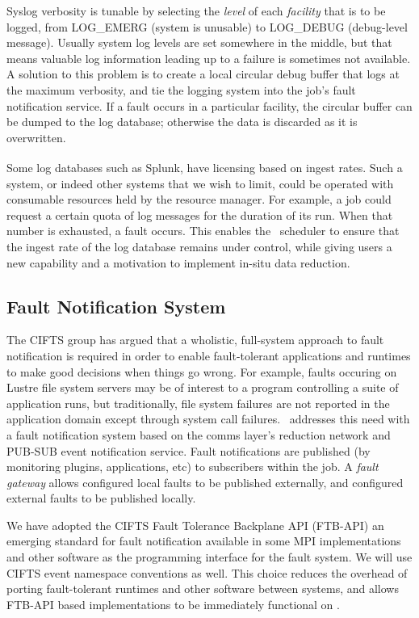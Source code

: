 Syslog verbosity is tunable by selecting the {\em level} of each
{\em facility} that is to be logged, from LOG\_EMERG (system is unusable)
to LOG\_DEBUG (debug-level message).  Usually system log levels are set
somewhere in the middle, but that means valuable log information leading
up to a failure is sometimes not available.  A solution to this problem is
to create a local circular debug buffer that logs at the maximum verbosity,
and tie the logging system into the job's fault notification service.
If a fault occurs in a particular facility, the circular buffer can be
dumped to the log database; otherwise the data is discarded as it is
overwritten.

Some log databases such as Splunk\textsuperscript{\textregistered},
have licensing based on ingest rates.  Such a system, or indeed other
systems that we wish to limit, could be operated with consumable resources
held by the resource manager.  For example, a job could request a certain
quota of log messages for the duration of its run.  When that number
is exhausted, a fault occurs.  This enables the \ngrm\ scheduler to ensure
that the ingest rate of the log database remains under control, while
giving users a new capability and a motivation to implement in-situ data
reduction.

\subsection{Fault Notification System}

The CIFTS group has argued\cite{CIFTS} that a wholistic, full-system approach
to fault notification is required in order to enable fault-tolerant
applications and runtimes to make good decisions when things go wrong.
For example, faults occuring on Lustre file system servers may be of interest
to a program controlling a suite of application runs, but traditionally,
file system failures are not reported in the application domain except
through system call failures.
\ngrm\ addresses this need with a fault notification system based on
the comms layer's reduction network and PUB-SUB event notification service.
Fault notifications are published (by monitoring plugins, applications, etc)
to subscribers within the job.
A {\em fault gateway} allows configured local faults to be published externally,
and configured external faults to be published locally.

We have adopted the 
CIFTS Fault Tolerance Backplane API\cite{FTBAPI} (FTB-API)
an emerging standard for fault notification available in some MPI
implementations and other software as the programming interface for the
fault system.  We will use CIFTS event namespace conventions as well.
This choice reduces the overhead of porting fault-tolerant runtimes and
other software between systems, and allows FTB-API based implementations
to be immediately functional on \ngrm.

